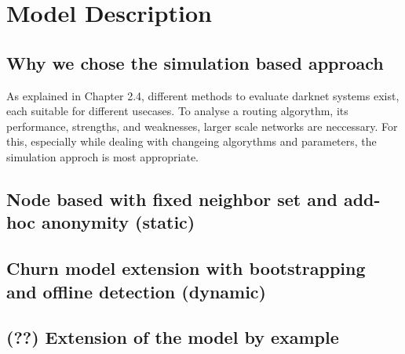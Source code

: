 \chapter{Model Description}

\section{Why we chose the simulation based approach}

As explained in Chapter 2.4, different methods to evaluate darknet systems exist, each suitable for different usecases. To analyse a routing algorythm, its performance, strengths, and weaknesses, larger scale networks are neccessary. For this, especially while dealing with changeing algorythms and parameters, the simulation approch is most appropriate.

\section{Node based with fixed neighbor set and add-hoc anonymity (static)}



\section{Churn model extension with bootstrapping and offline detection (dynamic)}
\section{(??) Extension of the model by example}

